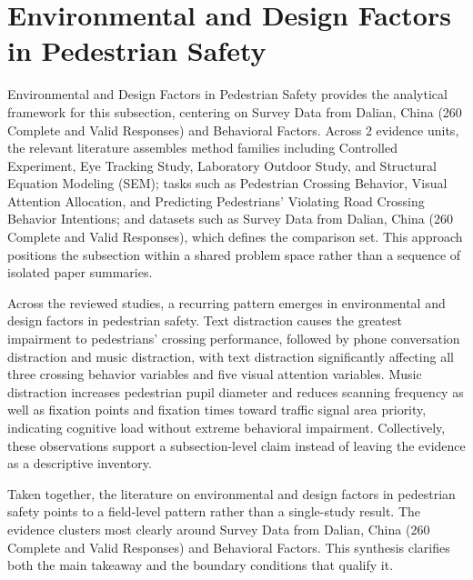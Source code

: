 \documentclass{article}
\begin{document}
\section{Environmental and Design Factors in Pedestrian Safety}
Environmental and Design Factors in Pedestrian Safety provides the analytical framework for this subsection, centering on Survey Data from Dalian, China (260 Complete and Valid Responses) and Behavioral Factors. Across 2 evidence units, the relevant literature assembles method families including Controlled Experiment, Eye Tracking Study, Laboratory Outdoor Study, and Structural Equation Modeling (SEM); tasks such as Pedestrian Crossing Behavior, Visual Attention Allocation, and Predicting Pedestrians' Violating Road Crossing Behavior Intentions; and datasets such as Survey Data from Dalian, China (260 Complete and Valid Responses), which defines the comparison set. This approach positions the subsection within a shared problem space rather than a sequence of isolated paper summaries. \cite{09_2018_jiang_aap,08_2016_zhou_aap}

Across the reviewed studies, a recurring pattern emerges in environmental and design factors in pedestrian safety. Text distraction causes the greatest impairment to pedestrians' crossing performance, followed by phone conversation distraction and music distraction, with text distraction significantly affecting all three crossing behavior variables and five visual attention variables. Music distraction increases pedestrian pupil diameter and reduces scanning frequency as well as fixation points and fixation times toward traffic signal area priority, indicating cognitive load without extreme behavioral impairment. Collectively, these observations support a subsection-level claim instead of leaving the evidence as a descriptive inventory. \cite{09_2018_jiang_aap,08_2016_zhou_aap}

Taken together, the literature on environmental and design factors in pedestrian safety points to a field-level pattern rather than a single-study result. The evidence clusters most clearly around Survey Data from Dalian, China (260 Complete and Valid Responses) and Behavioral Factors. This synthesis clarifies both the main takeaway and the boundary conditions that qualify it. \cite{09_2018_jiang_aap,08_2016_zhou_aap}
\end{document}
